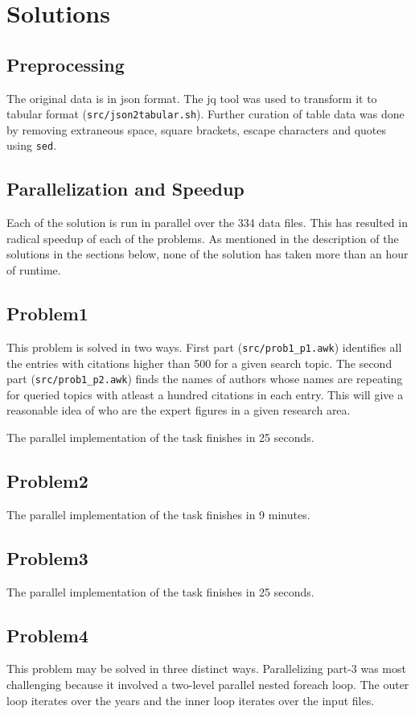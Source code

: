 \documentclass{article}
\begin{document}
\section*{Solutions}
\subsection*{Preprocessing}
The original data is in json format. The jq tool was used to transform it to
tabular format (\texttt{src/json2tabular.sh}). Further curation of table data
was done by removing extraneous space, square brackets, escape characters and
quotes using \texttt{sed}.

\subsection*{Parallelization and Speedup}
Each of the solution is run in parallel over the 334 data files. This has
resulted in radical speedup of each of the problems. As mentioned in the
description of the solutions in the sections below, none of the solution has
taken more than an hour of runtime.

\subsection*{Problem1}
This problem is solved in two ways. First part (\texttt{src/prob1\_p1.awk}) identifies
all the entries with citations higher than 500 for a given search topic. The
second part (\texttt{src/prob1\_p2.awk}) finds the names of authors whose names
are repeating for queried topics with atleast a hundred citations in each
entry. This will give a reasonable idea of who are the expert figures in a
given research area. 

The parallel implementation of the task finishes in 25 seconds.

\subsection*{Problem2}
The parallel implementation of the task finishes in 9 minutes.
\subsection*{Problem3}
The parallel implementation of the task finishes in 25 seconds.
\subsection*{Problem4}
This problem may be solved in three distinct ways. Parallelizing part-3 was
most challenging because it involved a two-level parallel nested foreach loop.
The outer loop iterates over the years and the inner loop iterates over the
input files.
\end{document}
